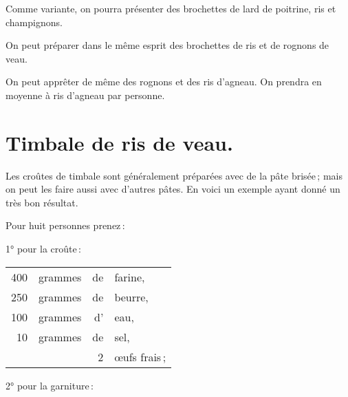\sk

Comme variante, on pourra présenter des brochettes de lard de poitrine, ris et
champignons.

\sk

On peut préparer dans le même esprit des brochettes de ris et de rognons de
veau.

\sk

On peut apprêter de même des rognons et des ris d'agneau. On prendra en moyenne
{\mmm} à {\mmm} ris d'agneau par personne.

\section*{\centering Timbale de ris de veau.}
{}

Les croûtes de timbale sont généralement préparées avec de la pâte brisée ;
mais on peut les faire aussi avec d'autres pâtes. En voici un exemple ayant
donné un très bon résultat.

Pour huit personnes prenez :

\medskip

1° pour la croûte :

\footnotesize
\begin{longtable}{rrrp{18em}}
    400 & grammes & de & farine,                                                                          \\
    250 & grammes & de & beurre,                                                                          \\
    100 & grammes & d' & eau,                                                                             \\
     10 & grammes & de & sel,                                                                             \\
        &         &  2 & œufs frais ;                                                                     \\
\end{longtable}
\normalsize

\medskip

2° pour la garniture :

